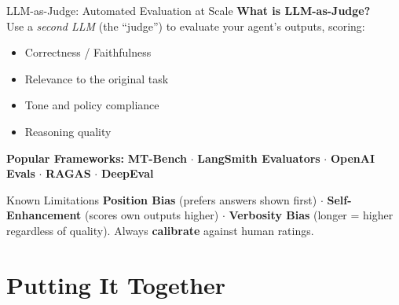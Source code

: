 \documentclass{beamer}       %
\begin{document}
\begin{frame}{LLM-as-Judge: Automated Evaluation at Scale}
    \small
    \textbf{What is LLM-as-Judge?} \\
    Use a \textit{second LLM} (the ``judge'') to evaluate your agent's outputs, scoring:
    \begin{itemize}
        \item Correctness / Faithfulness
        \item Relevance to the original task
        \item Tone and policy compliance
        \item Reasoning quality
    \end{itemize}
    \vspace{0.2cm}
    \textbf{Popular Frameworks:}
    \textbf{MT-Bench} $\cdot$ \textbf{LangSmith Evaluators} $\cdot$ \textbf{OpenAI Evals} $\cdot$ \textbf{RAGAS} $\cdot$ \textbf{DeepEval}
    \vfill
    \begin{alertblock}{Known Limitations}
        \footnotesize \textbf{Position Bias} (prefers answers shown first) $\cdot$ \textbf{Self-Enhancement} (scores own outputs higher) $\cdot$ \textbf{Verbosity Bias} (longer = higher regardless of quality). Always \textbf{calibrate} against human ratings.
    \end{alertblock}
\end{frame}

\section{Putting It Together}
\end{document}
